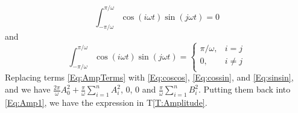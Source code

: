 \documentclass[12pt]{article}
\newcommand{\tref}[1]{T\ref{#1}}
\begin{document}
\begin{equation}\label{Eq:cossin}
	\int_{-\pi/\omega}^{\pi/\omega}\cos(i\omega t)\sin(j\omega t)=0
\end{equation}
and
\begin{equation}\label{Eq:sinsin}
	\int_{-\pi/\omega}^{\pi/\omega}\cos(i\omega t)\sin(j\omega t)=\begin{cases}
	\pi/\omega, &i=j\\
	0, &i\neq j\\
	\end{cases}
\end{equation}
Replacing terms \autoref{Eq:AmpTerms} with \autoref{Eq:coscos}, \autoref{Eq:cossin}, and \autoref{Eq:sinsin}, and we have $\frac{2\pi}{\omega}A_0^2+\frac{\pi}{\omega}\sum_{i=1}^{n}A_i^2$, $0$, $0$ and $\frac{\pi}{\omega}\sum_{i=1}^{n}B_i^2$. Putting them back into \autoref{Eq:Amp1}, we have the expression in \tref{T:Amplitude}.
\end{document}
